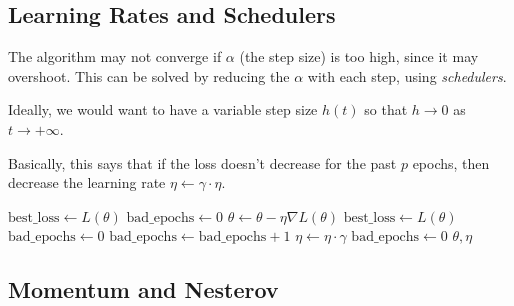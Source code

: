 \subsection{Learning Rates and Schedulers}

  The algorithm may not converge if $\alpha$ (the step size) is too high, since it may overshoot. This can be solved by reducing the $\alpha$ with each step, using \textit{schedulers}. 

  Ideally, we would want to have a variable step size $h(t)$ so that $h \rightarrow 0$ as $t \rightarrow + \infty$. 

  \begin{algo}
    Basically, this says that if the loss doesn't decrease for the past $p$ epochs, then decrease the learning rate $\eta \gets \gamma \cdot \eta$. 
    \begin{algorithm}[H]
    \label{alg:lr_decay_plateau}
    \begin{algorithmic}[1]  %

        \State $\text{best\_loss} \gets L(\theta)$ 
        \State $\text{bad\_epochs} \gets 0$
          \State $\theta \gets \theta - \eta \nabla L(\theta)$ 
            \State $\text{best\_loss} \gets L(\theta)$ 
            \State $\text{bad\_epochs} \gets 0$
          \Else 
            \State $\text{bad\_epochs} \gets \text{bad\_epochs} + 1$
          \EndIf 
            \State $\eta \gets \eta \cdot \gamma$ 
            \State $\text{bad\_epochs} \gets 0$
          \EndIf 
        \EndWhile
        \State \Return $\theta, \eta$
      \EndProcedure
    \end{algorithmic}
    \end{algorithm}
  \end{algo}

\subsection{Momentum and Nesterov}

